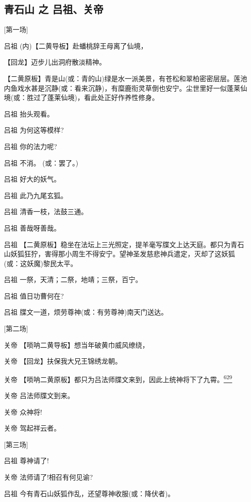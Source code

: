 \newpage
{}
\hypertarget{ux9752ux77f3ux5c71-ux4e4b-ux5415ux7956ux5173ux5e1d}{%
\subsection{青石山 之
吕祖、关帝}\label{ux9752ux77f3ux5c71-ux4e4b-ux5415ux7956ux5173ux5e1d}}

{[}第一场{]}

吕祖 (内)【二黄导板】赴蟠桃辞王母离了仙境，

【回龙】迈步儿出洞府散淡精神。

【二黄原板】青是山(或：青的山)绿是水一派美景，有苍松和翠柏密密层层。莲池内鱼戏水甚是沉静(或：看来沉静)，有糜鹿衔灵草倒也安宁。尘世里好一似蓬莱仙境(或：胜过了蓬莱仙境)，看此处正好作养性修身。

吕祖 抬头观看。

吕祖 为何这等模样?

吕祖 你的法力呢?

吕祖 不消。 (或：罢了。)

吕祖 好大的妖气。

吕祖 此乃九尾玄狐。

吕祖 清香一枝，法鼓三通。

吕祖 善哉呀善哉。

吕祖
【二黄原板】稳坐在法坛上三光照定，提羊毫写牒文上达天庭。都只为青石山妖狐狂狞，害得那小周生不得安宁。望神圣发慈悲神兵遣定，灭却了这妖狐(或：这妖魔)黎民太平。

吕祖 一祭，天清；二祭，地靖；三祭，百宁。

吕祖 值日功曹何在?

吕祖 牒文一道，烦劳尊神(或：有劳尊神)南天门送达。

{[}第二场{]}

关帝 【唢呐二黄导板】想当年破黄巾威风缭绕，

关帝 【回龙】扶保我大兄王锦绣龙朝。

关帝
【唢呐二黄原板】都只为吕法师牒文来到，因此上统神将下了九霄。\protect\hyperlink{fn629}{\textsuperscript{629}}

关帝 吕法师牒文到来。

关帝 众神将!

关帝 驾起祥云者。

{[}第三场{]}

吕祖 尊神请了!

关帝 法师请了!相召有何见谕?

吕祖 今有青石山妖狐作乱，还望尊神收服(或：降伏者)。

